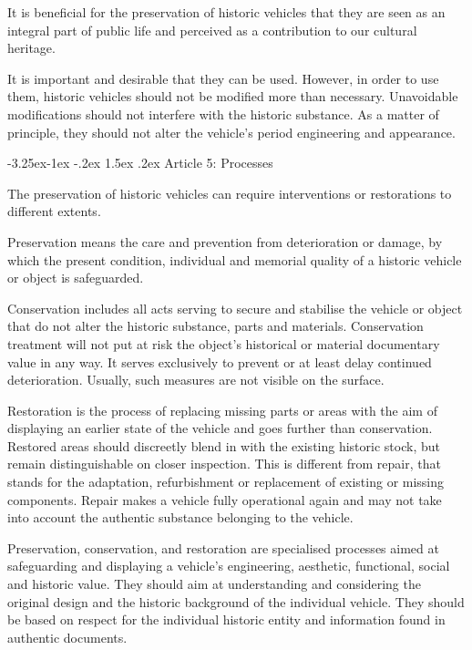 \documentclass[11pt]{article}
\makeatletter
\renewcommand\subsubsection{\@startsection{subsubsection}{3}{\z@}%
                                    {-3.25ex\@plus -1ex \@minus -.2ex}%
                                     {1.5ex \@plus .2ex}%
                                     {\normalfont\normalsize\fontfamily{phv}\fontsize{14}{17}\selectfont}}
\makeatother
\begin{document}
It is beneficial for the preservation of historic vehicles that they are seen as an integral part of public life and perceived as a contribution to our cultural heritage.

It is important and desirable that they can be used. However, in order to use them, historic vehicles should not be modified more than necessary. Unavoidable modifications should not interfere with the historic substance. As a matter of principle, they should not alter the vehicle’s period engineering and appearance.


\subsubsection{Article 5: Processes}

The preservation of historic vehicles can require interventions or restorations to different extents.

Preservation means the care and prevention from deterioration or damage, by which the present condition, individual and memorial quality of a historic vehicle or object is safeguarded.

Conservation includes all acts serving to secure and stabilise the vehicle or object that do not alter the historic substance, parts and materials. Conservation treatment will not put at risk the object’s historical or material documentary value in any way. It serves exclusively to prevent or at least delay continued deterioration. Usually, such measures are not visible on the surface.

Restoration is the process of replacing missing parts or areas with the aim of displaying an earlier state of the vehicle and goes further than conservation. Restored areas should discreetly blend in with the existing historic stock, but remain distinguishable on closer inspection. This is different from repair, that stands for the adaptation, refurbishment or replacement of existing or missing components. Repair makes a vehicle fully operational again and may not take into account the authentic substance belonging to the vehicle.

Preservation, conservation, and restoration are specialised processes aimed at safeguarding and displaying a vehicle’s engineering, aesthetic, functional, social and historic value. They should aim at understanding and considering the original design and the historic background of the individual vehicle. They should be based on respect for the individual historic entity and information found in authentic documents.
\end{document}

